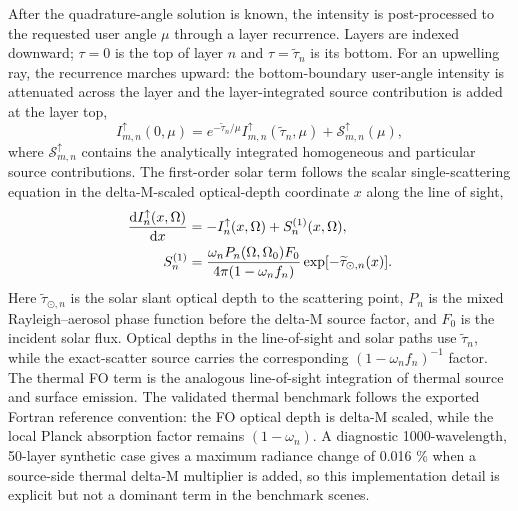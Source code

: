 \documentclass[gmd, manuscript]{copernicus}
\begin{document}
After the quadrature-angle solution is known, the intensity is post-processed to the
requested user angle $\mu$ through a layer recurrence.  Layers are indexed downward;
$\tau=0$ is the top of layer $n$ and $\tau=\widetilde{\tau}_n$ is its bottom.  For an
upwelling ray, the recurrence marches upward: the bottom-boundary user-angle intensity
is attenuated across the layer and the layer-integrated source contribution is added at
the layer top,
\begin{equation}
  I_{m,n}^{\uparrow}(0,\mu)
  =
  e^{-\widetilde{\tau}_n/\mu}
  I_{m,n}^{\uparrow}(\widetilde{\tau}_n,\mu)
  +
  \mathcal{S}_{m,n}^{\uparrow}(\mu),
  \label{eq:user_post}
\end{equation}
where $\mathcal{S}_{m,n}^{\uparrow}$ contains the analytically integrated homogeneous
and particular source contributions.  The first-order solar term follows the scalar
single-scattering equation in the delta-M-scaled optical-depth coordinate $x$ along the
line of sight,
\begin{equation}
  \begin{aligned}
  \frac{{\rm d}I_n^{\uparrow}(x,\Omega)}{{\rm d}x}
  &=
  -I_n^{\uparrow}(x,\Omega)+S_n^{(1)}(x,\Omega),\\
  S_n^{(1)}
  &=
  \frac{\omega_n P_n(\Omega,\Omega_0)F_0}
       {4\pi(1-\omega_n f_n)}
  \exp[-\widetilde{\tau}_{\odot,n}(x)] .
  \end{aligned}
  \label{eq:ss_rte}
\end{equation}
Here $\widetilde{\tau}_{\odot,n}$ is the solar slant optical depth to the scattering
point, $P_n$ is the mixed Rayleigh--aerosol phase function before the delta-M source
factor, and $F_0$ is the incident solar flux.  Optical depths in the line-of-sight and
solar paths use $\widetilde{\tau}_n$, while the exact-scatter source carries the
corresponding $(1-\omega_n f_n)^{-1}$ factor.  The thermal FO term is the analogous
line-of-sight integration of thermal source and surface emission.  The validated
thermal benchmark follows the exported Fortran reference convention: the FO optical
depth is delta-M scaled, while the local Planck absorption factor remains
$(1-\omega_n)$.  A diagnostic 1000-wavelength, 50-layer synthetic case gives a maximum
radiance change of 0.016 \% when a source-side thermal delta-M multiplier is added, so
this implementation detail is explicit but not a dominant term in the benchmark
scenes.
\end{document}
